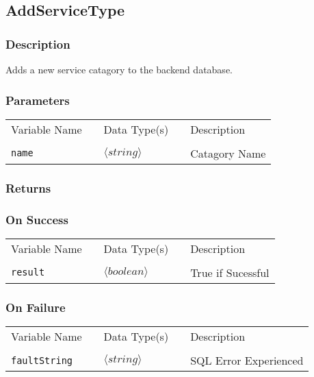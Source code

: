 
\subsection{AddServiceType}

\subsubsection{Description}

Adds a new service catagory to the backend database.

\subsubsection{Parameters}

\begin{tabular}{lllll}
Variable Name	&		&	Data Type(s)		&	&	Description	\\
				&	&	&	&	\\
\verb!name! & \hspace{15mm} & $\langle string\rangle $ & \hspace{15mm} & Catagory Name \\
\end{tabular}

\subsubsection{Returns}

\subsubsection{On Success}

\begin{tabular}{lllll}
Variable Name	&		&	Data Type(s)		&	&	Description	\\
				&	&	&	&	\\
\verb!result! & \hspace{15mm} & $\langle boolean\rangle $ & \hspace{15mm} & True if Sucessful \\
\end{tabular}

\subsubsection{On Failure}

\begin{tabular}{lllll}
Variable Name	&		&	Data Type(s)		&	&	Description	\\
				&	&	&	&	\\
\verb!faultString! & \hspace{15mm} & $\langle string\rangle $ & \hspace{15mm} & SQL Error Experienced \\
\end{tabular}

